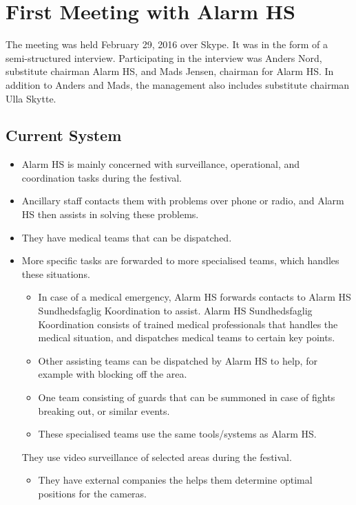 \section{First Meeting with Alarm HS}\label{sec:first_meeting_alarmhs_summary}

The meeting was held February 29, 2016 over Skype. It was in the form of a semi-structured interview. Participating in the interview was Anders Nord, substitute chairman Alarm HS, and Mads Jensen, chairman for Alarm HS. In addition to Anders and Mads, the management also includes substitute chairman Ulla Skytte.

\subsection*{Current System}

\begin{itemize}
    \item Alarm HS is mainly concerned with surveillance, operational, and coordination tasks during the festival.
    \item Ancillary staff contacts them with problems over phone or radio, and Alarm HS then assists in solving these problems.
    \item They have medical teams that can be dispatched. 
    \item More specific tasks are forwarded to more specialised teams, which handles these situations.
    \begin{itemize}
        \item In case of a medical emergency, Alarm HS forwards contacts to Alarm HS Sundhedsfaglig Koordination to assist. Alarm HS Sundhedsfaglig Koordination consists of trained medical professionals that handles the medical situation, and dispatches medical teams to certain key points.
        \item Other assisting teams can be dispatched by Alarm HS to help, for example with blocking off the area.
        \item One team consisting of guards that can be summoned in case of fights breaking out, or similar events.
        \item These specialised teams use the same tools/systems as Alarm HS.
    \end{itemize}
    They use video surveillance of selected areas during the festival.
    \begin{itemize}
        \item They have external companies the helps them determine optimal positions for the cameras.

\end{itemize}
\end{itemize}
